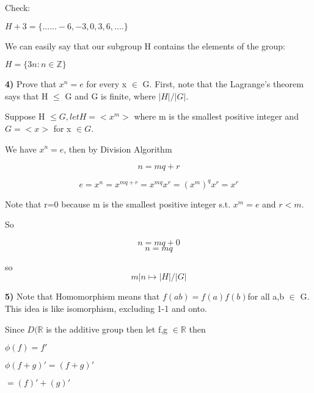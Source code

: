 \documentclass{article}
\begin{document}
Check:

\medskip

$H+3=\{......-6, -3, 0, 3,  6,....\}$


\medskip


We can easily say that our subgroup H contains the elements of the group:

\medskip

$H=\{3n : n \in \mathbb{Z} \}$



\newpage

\textbf{4)} Prove that $x^{n}=e$ for every x $\in$ G. First, note that the Lagrange's theorem says that H $\leq$ G and G is finite, where $|H|/|G|$.

\medskip 

Suppose H $\leq G, let H=<x^{m}>$ where m is the smallest positive integer and $G=<x>$ for x $\in G$.

\medskip

We have $x^{n}=e$, then by Division Algorithm

\medskip

$$n=mq+r$$

$$e=x^{n}=x^{mq+r}=x^{mq}x^{r}=(x^{m})^{q}x^{r}=x^{r}$$


Note that r=0 because m is the smallest positive integer s.t. $x^{m}=e$ and $r < m.$ 

\medskip

So 

$$n=mq+0$$
$$n=mq$$


so $$m|n \mapsto |H|/|G|$$





\newpage

\textbf{5)}  Note that Homomorphism means that $f(ab)=f(a)f(b)$for all a,b $\in$ G. This idea is like isomorphism, excluding 1-1 and onto. 

\medskip

Since $D(\mathbb{R}$ is the additive group then let f,g $\in \mathbb{R}$ then 

\medskip

$\phi(f)=f'$

\medskip

$\phi(f+g)'=(f+g)'$

\medskip


 \hspace{.6in}$=(f)'+(g)'$
 
 \medskip
\end{document}
